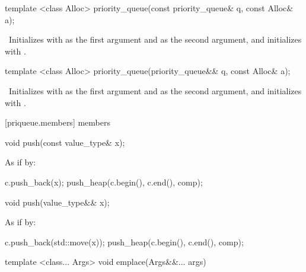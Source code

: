%
\begin{itemdecl}
template <class Alloc> priority_queue(const priority_queue& q, const Alloc& a);
\end{itemdecl}

\begin{itemdescr}
\pnum
\effects\ Initializes  with  as the first argument and  as
the second argument, and initializes  with .
\end{itemdescr}

%
\begin{itemdecl}
template <class Alloc> priority_queue(priority_queue&& q, const Alloc& a);
\end{itemdecl}

\begin{itemdescr}
\pnum
\effects\ Initializes  with  as the first argument and 
as the second argument, and initializes  with .
\end{itemdescr}

[priqueue.members]{ members}

%
\begin{itemdecl}
void push(const value_type& x);
\end{itemdecl}

\begin{itemdescr}
\pnum
\effects
As if by:
\begin{codeblock}
c.push_back(x);
push_heap(c.begin(), c.end(), comp);
\end{codeblock}
\end{itemdescr}

%
\begin{itemdecl}
void push(value_type&& x);
\end{itemdecl}

\begin{itemdescr}
\pnum
\effects
As if by:
\begin{codeblock}
c.push_back(std::move(x));
push_heap(c.begin(), c.end(), comp);
\end{codeblock}
\end{itemdescr}

%
%
\begin{itemdecl}
template <class... Args> void emplace(Args&&... args)
\end{itemdecl}

